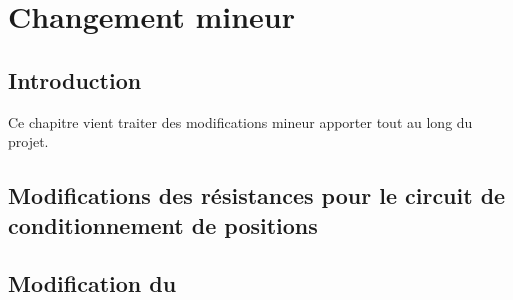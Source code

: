 \chapter{Changement mineur}

\section{Introduction}
Ce chapitre vient traiter des modifications mineur apporter tout au long du projet.

\section{Modifications des résistances pour le circuit de conditionnement de positions}

\section{Modification du }
